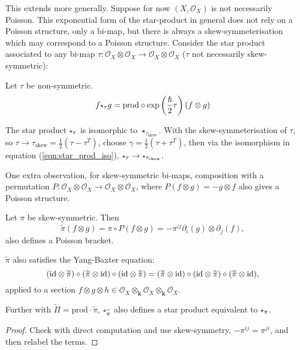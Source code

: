     This extends more generally. Suppose for now \( (X, \mathcal{O}_X )\) is not necessarily Poisson. This exponential form of the star-product in general does not rely on a Poisson structure, only a bi-map, but there is always a skew-symmeterisation which may correspond to a Poisson structure. Consider the star product associated to any bi-map \( \tau : \mathcal{O}_X \otimes \mathcal{O}_X \rightarrow \mathcal{O}_X \otimes \mathcal{O}_X\) (\( \tau\) not necessarily skew-symmetric):
    \begin{defn} Let \( \tau\) be non-symmetric.
    \[  f \starp_{\tau} g = \mathrm{prod} \circ \exp \left( \frac{\hslash}{2} \tau \right) ( f \otimes g) \]
   \end{defn} 
    The star product \( \starp_\tau \) is isomorphic to \( \star_{\tau_{\text{skew}}}\). With the skew-symmeterisation of \( \tau\), so \( \tau \rightarrow \tau_{\text{skew}} =\frac{1}{2} \left( \tau -  \tau^T \right) \), choose \( \gamma = \frac{1}{2}\left( \tau + \tau^T\right) \), then via the isomorphism in equation (\ref{eqn:star_prod_iso}),  \( \starp_{\tau} \rightarrow \starp_{\tau_{\text{skew}}}\).

    One extra observation, for skew-symmetric bi-maps, composition with a permutation \( P : \mathcal{O}_X \otimes \mathcal{O}_X \rightarrow \mathcal{O}_X \otimes \mathcal{O}_X \), where \(P(f \otimes g) = - g \otimes f\) also gives a Poisson structure.
    
    \begin{lem} Let \( \pi \) be skew-symmetric.
    Then \[  \widetilde{\pi} (f\otimes g)= \pi \circ P ( f \otimes g) = -\pi^{ij} \partial_i (g) \otimes \partial_j (f), \] also defines a Poisson bracket.
    
    \( \widetilde{\pi}\) also satisfies the Yang-Baxter equation:
    \[ (\mathrm{id} \otimes \widetilde{\pi}) \circ ( \widetilde{\pi} \otimes \mathrm{id}  ) \circ ( \mathrm{id} \otimes \widetilde{\pi}) =  ( \widetilde{\pi} \otimes \mathrm{id} ) \circ (\mathrm{id} \otimes \widetilde{\pi}) \circ  ( \widetilde{\pi} \otimes \mathrm{id} ), \] 
     applied to a section \( f \otimes g \otimes h  \in \mathcal{O}_X \otimes_{\mathbf{k}} \mathcal{O}_X \otimes_{\mathbf{k}} \mathcal{O}_X  \).
     
    Further with \( \widetilde{\Pi} = \mathrm{prod} \cdot \widetilde{\pi}\), \( \starp_{\widetilde{\pi}}\) also defines a star product equivalent to  \( \starp_{\pi}\).
    \end{lem}
    
    \begin{proof}
    Check with direct computation and use skew-symmetry, \( -\pi^{ij} = \pi^{ji}\), and then relabel the terms.
    \end{proof}
    
